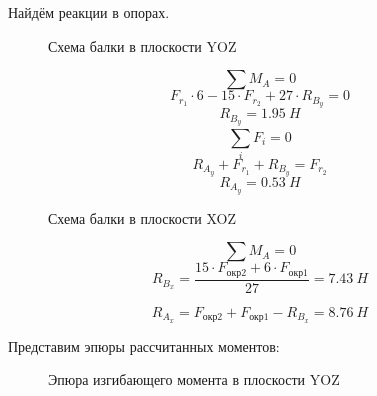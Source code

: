 \documentclass[14pt,a4paper,russian]{scrartcl}
\begin{document}
        Найдём реакции в опорах.\par
        \begin{figure}[h]
            \caption{Схема балки в плоскости YOZ}
        \end{figure}
        \[ \sum M_A = 0 \]
        \[ F_{r_1}\cdot 6 - 15\cdot F_{r_2} + 27\cdot R_{B_y} = 0\]
        \[ R_{B_y} = 1.95\ H\]
        \[ \sum_{i}^{}F_i = 0 \]
        \[ R_{A_y} + F_{r_1} + R_{B_y} = F_{r_2} \]
        \[ R_{A_y} = 0.53\ H\]        
        
        \begin{figure}[h]
            \caption{Схема балки в плоскости XOZ}
        \end{figure}
        \[ \sum M_A = 0 \]
        \[ R_{B_x} = \frac{15\cdot F_{\text{окр2}} + 6\cdot F_{\text{окр1}}}{27} = 7.43\ H\]
        
        \[ R_{A_x} = F_{\text{окр2}} + F_{\text{окр1}} - R_{B_x} = 8.76\ H\]

        Представим эпюры рассчитанных моментов:
 
        \begin{figure}[!h]
            \caption{Эпюра изгибающего момента в плоскости YOZ}
        \end{figure}
\end{document}
